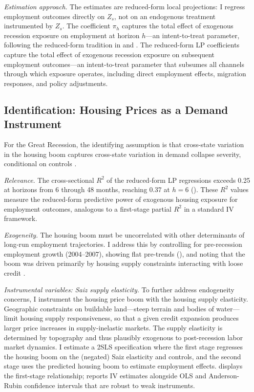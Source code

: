 \documentclass[12pt]{article}
\begin{document}
\textit{Estimation approach.} The estimates are reduced-form local projections: I regress employment outcomes directly on $Z_s$, not on an endogenous treatment instrumented by $Z_s$. The coefficient $\pi_h$ captures the total effect of exogenous recession exposure on employment at horizon $h$---an intent-to-treat parameter, following the reduced-form tradition in \citet{mian2014explains} and \citet{autor2013china}. The reduced-form LP coefficients capture the total effect of exogenous recession exposure on subsequent employment outcomes---an intent-to-treat parameter that subsumes all channels through which exposure operates, including direct employment effects, migration responses, and policy adjustments.

\subsection{Identification: Housing Prices as a Demand Instrument}

For the Great Recession, the identifying assumption is that cross-state variation in the housing boom captures cross-state variation in demand collapse severity, conditional on controls \citep{mian2014explains, mian2013household, charles2016masking}.

\textit{Relevance.} The cross-sectional $R^2$ of the reduced-form LP regressions exceeds 0.25 at horizons from 6 through 48 months, reaching 0.37 at $h = 6$ (). These $R^2$ values measure the reduced-form predictive power of exogenous housing exposure for employment outcomes, analogous to a first-stage partial $R^2$ in a standard IV framework.

\textit{Exogeneity.} The housing boom must be uncorrelated with other determinants of long-run employment trajectories. I address this by controlling for pre-recession employment growth (2004--2007), showing flat pre-trends (), and noting that the boom was driven primarily by housing supply constraints interacting with loose credit \citep{saiz2010geographic}.

\textit{Instrumental variables: Saiz supply elasticity.} To further address endogeneity concerns, I instrument the housing price boom with the \citet{saiz2010geographic} housing supply elasticity. Geographic constraints on buildable land---steep terrain and bodies of water---limit housing supply responsiveness, so that a given credit expansion produces larger price increases in supply-inelastic markets. The supply elasticity is determined by topography and thus plausibly exogenous to post-recession labor market dynamics. I estimate a 2SLS specification where the first stage regresses the housing boom on the (negated) Saiz elasticity and controls, and the second stage uses the predicted housing boom to estimate employment effects.  displays the first-stage relationship;  reports IV estimates alongside OLS and Anderson-Rubin confidence intervals that are robust to weak instruments.
\end{document}
